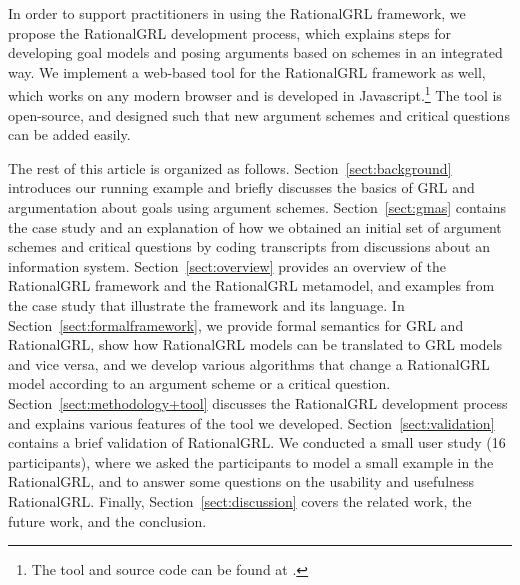 In order to support practitioners in using the RationalGRL framework, we propose the RationalGRL development process, which explains steps for  developing goal models and posing arguments based on schemes in an integrated way. We implement a web-based tool for the RationalGRL framework as well, which works on any modern browser and is developed in Javascript.\footnote{The tool and source code can be found at \rationalgrlurl.} The tool is open-source, and designed such that new argument schemes and critical questions can be added easily.

The rest of this article is organized as follows. Section~\ref{sect:background} introduces our running example and briefly discusses the basics of GRL and argumentation about goals using argument schemes. Section~\ref{sect:gmas} contains the case study and an explanation of how we obtained an initial set of argument schemes and critical questions by coding transcripts from discussions about an information system. Section~\ref{sect:overview} provides an overview of the RationalGRL framework and the RationalGRL metamodel, and examples from the case study that illustrate the framework and its language. In Section~\ref{sect:formalframework}, we provide formal semantics for GRL and RationalGRL, show how RationalGRL models can be translated to GRL models and vice versa, and we develop various algorithms that change a RationalGRL model according to an argument scheme or a critical question. Section~\ref{sect:methodology+tool} discusses the RationalGRL development process and explains various features of the tool we developed. Section~\ref{sect:validation} contains a brief validation of RationalGRL. We conducted a small user study (16 participants), where we asked the participants to model a small example in the RationalGRL, and to answer some questions on the usability and usefulness RationalGRL. Finally, Section~\ref{sect:discussion} covers the related work, the future work, and the conclusion.
